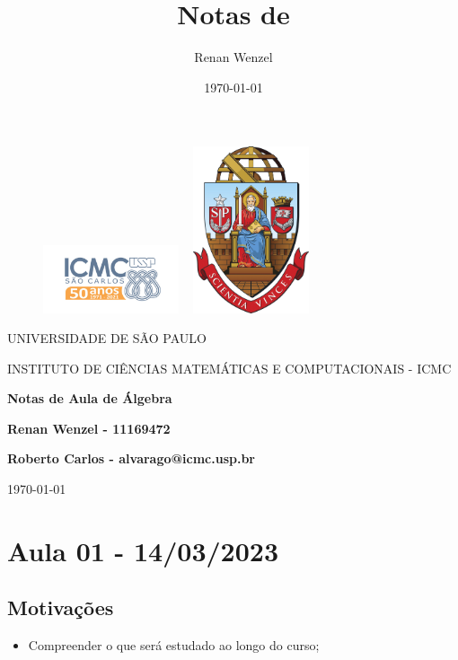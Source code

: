 \documentclass{article}
\title{Notas de }
\author{Renan Wenzel}
\date{\today}
\begin{document}
 \begin{figure}[ht]
		\includegraphics[width=4cm]{../icmc.png}
		\hspace{7cm}
		\includegraphics[height=4.9cm,width=4cm]{../brasao_usp_cor.jpg}
	\endminipage	
\end{figure}

\begin{center}
	\vspace{1cm}
	\LARGE
	UNIVERSIDADE DE S\~AO PAULO

	\vspace{1.3cm}
	\LARGE
	INSTITUTO DE CI\^ENCIAS MATEM\'ATICAS E COMPUTACIONAIS - ICMC

	\vspace{1.7cm}
	\Large
	\textbf{Notas de Aula de \'Algebra}

	\vspace{1.3cm}
	\large
	\textbf{Renan Wenzel - 11169472}

	\vspace{1.3cm}
	\large
	\textbf{Roberto Carlos - alvarago@icmc.usp.br}

	\vspace{1.3cm}
	\today
\end{center}

 \newpage

 \tableofcontents

 \newpage

\section{Aula 01 - 14/03/2023}
\subsection{Motiva\c c\~oes}
\begin{itemize}
  \item Compreender o que ser\'a estudado ao longo do curso;
\end{itemize}
\end{document}
